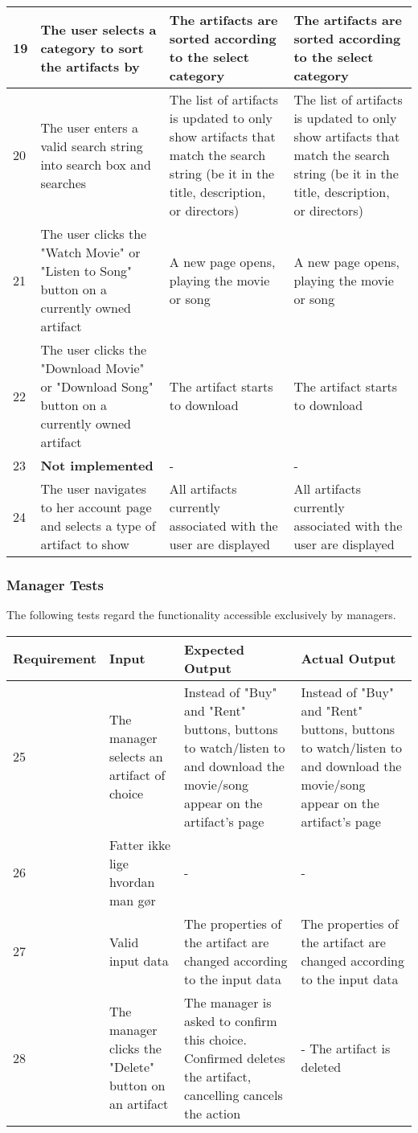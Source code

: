 {{\begin{tabular}{ | p{2cm} | p{3cm} | p{4cm} | p{4cm} | }
	\hline
	19 & The user selects a category to sort the artifacts by & The artifacts are sorted according to the select category & The artifacts are sorted according to the select category \\
	\hline
	20 & The user enters a valid search string into search box and searches & The list of artifacts is updated to only show artifacts that match the search string (be it in the title, description, or directors) & The list of artifacts is updated to only show artifacts that match the search string (be it in the title, description, or directors) \\
	\hline
	21 & The user clicks the "Watch Movie" or "Listen to Song" button on a currently owned artifact & A new page opens, playing the movie or song & A new page opens, playing the movie or song \\
	\hline
	22 & The user clicks the "Download Movie" or "Download Song" button on a currently owned artifact & The artifact starts to download & The artifact starts to download \\
	\hline
	23 & \textbf{Not implemented}  & - & - \\
	\hline
	24 & The user navigates to her account page and selects a type of artifact to show & All artifacts currently associated with the user are displayed & All artifacts currently associated with the user are displayed \\
	\hline
\end{tabular}}}

\subsubsection{Manager Tests}
The following tests regard the functionality accessible exclusively by managers. \\
{\centering
\scalebox{0.7}
{\begin{tabular}{ | p{2cm} | p{3cm} | p{4cm} | p{4cm} | }
	\hline
	Requirement & Input & Expected Output & Actual Output \\
	\hline
	25 & The manager selects an artifact of choice & Instead of "Buy" and "Rent" buttons, buttons to watch/listen to and download the movie/song appear on the artifact's page & Instead of "Buy" and "Rent" buttons, buttons to watch/listen to and download the movie/song appear on the artifact's page \\
	\hline
	26 & Fatter ikke lige hvordan man gør & - & - \\
	\hline
	27 & Valid input data & The properties of the artifact are changed according to the input data & The properties of the artifact are changed according to the input data \\
	\hline
	28 & The manager clicks the "Delete" button on an artifact & The manager is asked to confirm this choice. Confirmed deletes the artifact, cancelling cancels the action & - The artifact is deleted \\
	\hline
\end{tabular}}}